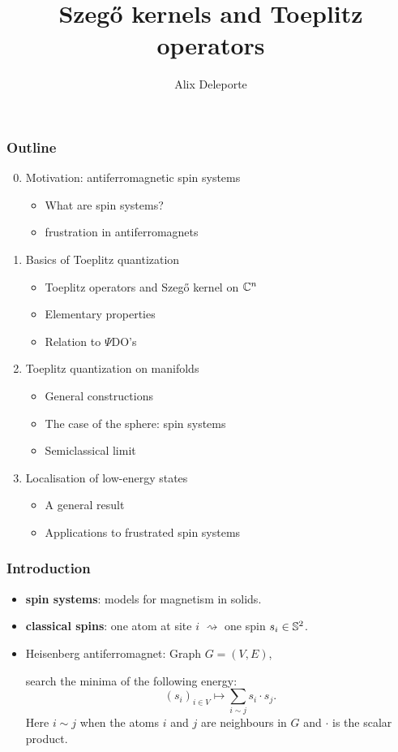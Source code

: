 \documentclass[mathserif]{beamer}
\title{Szeg\H{o} kernels and Toeplitz operators}
\author{Alix Deleporte}
\institute{MSRI}
\begin{document}
\beamertemplatenavigationsymbolsempty

    \expandafter\def\expandafter\insertshorttitle\expandafter{%
       \insertshorttitle\hfill%
       }%


\begin{frame}
	\titlepage
      \end{frame}

      \begin{frame}
        \frametitle{Outline}
        \begin{enumerate}\setcounter{enumi}{-1}
        \item Motivation: antiferromagnetic spin systems
          \begin{itemize}
          \item What are spin systems?
          \item frustration in antiferromagnets
          \end{itemize}
        \item Basics of Toeplitz quantization
          \begin{itemize}
          \item Toeplitz operators and Szeg\H{o} kernel on $\C^n$
          \item Elementary properties
          \item Relation to $\Psi$DO's
          \end{itemize}
        \item Toeplitz quantization on manifolds
          \begin{itemize}
          \item General constructions
          \item The case of the sphere: spin systems
          \item Semiclassical limit
          \end{itemize}
        \item Localisation of low-energy states
          \begin{itemize}
          \item A general result
          \item Applications to frustrated spin systems
          \end{itemize}
        \end{enumerate}
      \end{frame}

\begin{frame}
  \frametitle{Introduction}
  \begin{itemize}
  \item<1-> {\bfseries spin systems}: models for magnetism in solids.
  \item<2-> {\bfseries classical spins}: one atom at site $i$
    $\rightsquigarrow$ one spin $s_i\in \S^2$.
  \item<3> Heisenberg antiferromagnet: Graph $G=(V,E)$,
    
    search the minima of the following energy:
    \[
      (s_i)_{i\in V}\mapsto\sum_{i\sim j}s_i\cdot s_j.
    \]
    Here $i\sim j$ when the atoms $i$ and $j$ are neighbours in $G$
    and $\cdot$ is the scalar product.
  \end{itemize}
\end{frame}
\end{document}
